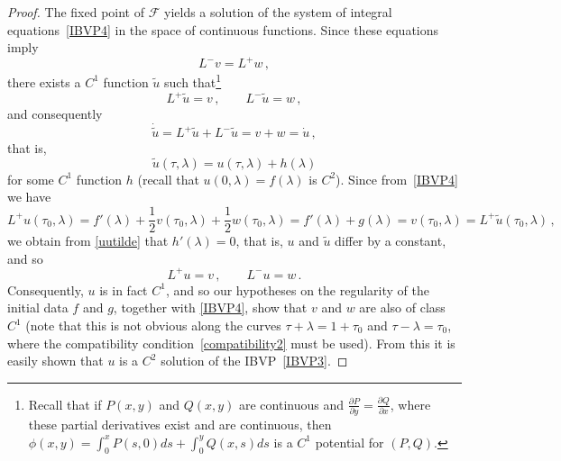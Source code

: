 \documentclass[10pt,a4paper]{amsart}
\newcommand{\cF}{\mathcal{F}}
\begin{document}
\begin{proof}
The fixed point of $\cF$ yields a solution of the system of integral equations~\eqref{IBVP4} in the space of continuous functions. Since these equations imply
\begin{equation}
L^- v = L^+w  \, ,
\end{equation}
there exists a $C^1$ function $\tilde{u}$ such that\footnote{Recall that if $P(x,y)$ and $Q(x,y)$ are continuous and $\frac{\partial P}{\partial y} = \frac{\partial Q}{\partial x}$, where these partial derivatives exist and are continuous, then $\phi(x,y) = \int_0^x P(s,0) ds + \int_0^y Q(x,s) ds$ is a $C^1$ potential for $(P,Q)$.}
\begin{equation}
L^+\tilde{u} = v \, , \qquad L^-\tilde{u} = w \, ,
\end{equation}
and consequently
\begin{equation}
\dot{\tilde{u}} = L^+\tilde{u} + L^-\tilde{u} = v + w = \dot{u} \, ,
\end{equation}
that is,
\begin{equation} \label{uutilde}
\tilde{u}(\tau,\lambda) = u(\tau,\lambda) + h(\lambda)
\end{equation}
for some $C^1$ function $h$ (recall that $u(0,\lambda)=f(\lambda)$ is $C^2$). Since from~\eqref{IBVP4} we have
\begin{equation}
L^+u(\tau_0,\lambda) = f'(\lambda) + \frac12 v(\tau_0,\lambda) + \frac12 w(\tau_0,\lambda) = f'(\lambda) + g(\lambda) = v(\tau_0,\lambda) = L^+ \tilde{u}(\tau_0,\lambda) \, ,
\end{equation}
we obtain from \eqref{uutilde} that $h'(\lambda)=0$, that is, $u$ and $\tilde{u}$ differ by a constant, and so
\begin{equation}
L^+u = v \, , \qquad L^-u = w \, .
\end{equation}
Consequently, $u$ is in fact $C^1$, and so our hypotheses on the regularity of the initial data $f$ and $g$, together with \eqref{IBVP4}, show that $v$ and $w$ are also of class $C^1$ (note that this is not obvious along the curves $\tau + \lambda = 1 + \tau_0$ and $\tau - \lambda = \tau_0$, where the compatibility condition~\eqref{compatibility2} must be used). From this it is easily shown that $u$ is a $C^2$ solution of the IBVP~\eqref{IBVP3}.


\end{proof}
\end{document}
